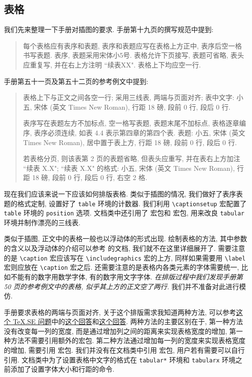 \zhlipsum[1]

\subsection{表格}

我们先来整理一下手册对插图的要求. 手册第十九页的撰写规范中提到:
\begin{quote}
  每个表格应有表序和表题, 表序和表题应写在表格上方正中, 表序后空一格书写表题. 表序, 表题采用宋体小5号. 表格允许下页接写, 表题可省略, 表头应重复写, 并在右上方注明 ``{\songti 续表XX}". 表格上下均应空一行.
\end{quote}
手册第五十一页及第五十二页的参考例文中提到:
\begin{quote}
  表格上下与正文之间各空一行;
  采用三线表, 两端与页面对齐;
  表中文字: 小五, 宋体 (英文 Times New Roman), 行距 18 磅, 段前 0 行, 段后 0 行.

  表序写在表题左方不加标点, 空一格写表题, 表题末尾不加标点, 表格逐章编序, 表序必须连续, 如表 4.4 表示第四章的第四个表. 表题: 小五, 宋体 (英文 Times New Roman), 居中置于表上方, 行距 18 磅, 段前 0 行, 段后 0 行.

  若表格分页, 则该表第 2 页的表题省略, 但表头应重写, 并在表右上方加注 ``续表 X.X";
  ``续表 X.X" 的格式: 小五, 宋体 (英文 Times New Roman), 行距 18 磅, 段前 0 行, 段后 0 行, 右空 2 格.
\end{quote}

现在我们应该来说一下应该如何排版表格. 类似于插图的情况, 我们做好了表序表题的格式定制, 设置好了 \verb|table| 环境的计数器. 我们利用 \verb|\captionsetup| 宏配置了 \verb|table| 环境的 \verb|position| 选项. 文档类中还引用了  宏包和  宏包, 用来改良 \verb|tabular| 环境并制作漂亮的三线表.

类似于插图, 正文中的表格一般也以浮动体的形式出现. 绘制表格的方法, 其中参数的含义以及浮动体的介绍可以参考  的文档, 我们就不在这里详细展开了. 需要注意的是 \verb|\caption| 宏应该写在 \verb|\includegraphics| 宏的上方, 同样如果需要用 \verb|\label| 宏则应放在 \verb|\caption| 宏之后. 还需要注意的是表格内各类元素的字体需要统一, 比如不能有的数字用数学字体, 有的数字用文字字体. \emph{在排版过程中我们发现手册第 50 页的参考例文中的表格, 似乎其上方的正文空了两行.} 我们并不准备对此进行模仿.

手册要求表格的两端与页面对齐, 关于这个排版需求我知道两种方法, 可以参考\href{https://tex.stackexchange.com/questions/10535}{这个 TeX.SE 问题}中的\href{https://tex.stackexchange.com/a/56552}{这个回答}和\href{https://tex.stackexchange.com/a/10540}{这个回答}. 两种方法的主要区别在于, 第一种方法没有改变每一列的宽度, 而是通过增加列之间的距离来实现表格宽度的增加, 第一种方法不需要引用额外的宏包. 第二种方法通过增加每一列的宽度来实现表格宽度的增加, 需要引用  宏包. 我们并没有在文档类中引用  宏包, 用户若有需要可以自行引用. 文档类中为了设置表格中文字的格式在 \verb|tabular*| 环境和 \verb|tabularx| 环境之前添加了设置字体大小和行距的命令.

